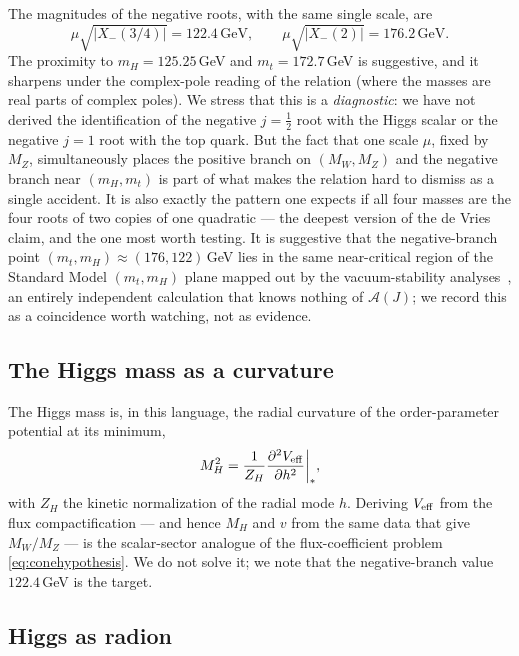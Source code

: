 \documentclass[11pt]{article}
\theoremstyle{plain}
\theoremstyle{definition}
\newcommand{\cA}{\mathcal{A}}
\newcommand{\Xm}{X_{-}}
\newcommand{\half}{\tfrac12}
\begin{document}
The magnitudes of the negative roots, with the same single scale, are
\begin{equation}
\mu\sqrt{|\Xm(3/4)|}=122.4\,\text{GeV},\qquad
\mu\sqrt{|\Xm(2)|}=176.2\,\text{GeV}.
\end{equation}
The proximity to $m_H=125.25\,$GeV and $m_t=172.7\,$GeV is suggestive, and
it sharpens under the complex-pole reading of the relation (where the
masses are real parts of complex poles). We stress that this is a
\emph{diagnostic}: we have not derived the identification of the negative
$j=\half$ root with the Higgs scalar or the negative $j=1$ root with the
top quark. But the fact that one scale $\mu$, fixed by $M_Z$, simultaneously
places the positive branch on $(M_W,M_Z)$ and the negative branch near
$(m_H,m_t)$ is part of what makes the relation hard to dismiss as a single
accident. It is also exactly the pattern one expects if all four masses are
the four roots of two copies of one quadratic --- the deepest version of
the de Vries claim, and the one most worth testing. It is suggestive that the
negative-branch point $(m_t,m_H)\approx(176,122)\,$GeV lies in the same
near-critical region of the Standard Model $(m_t,m_H)$ plane mapped out by the
vacuum-stability analyses~\cite{Buttazzo2013}, an entirely independent
calculation that knows nothing of $\cA(J)$; we record this as a coincidence
worth watching, not as evidence.

\subsection{The Higgs mass as a curvature}

The Higgs mass is, in this language, the radial curvature of the
order-parameter potential at its minimum,
\begin{equation}
M_H^2=\frac1{Z_H}\frac{\partial^2 V_{\rm eff}}{\partial h^2}\bigg|_{*},
\end{equation}
with $Z_H$ the kinetic normalization of the radial mode $h$. Deriving
$V_{\rm eff}$ from the flux compactification --- and hence $M_H$ and $v$
from the same data that give $M_W/M_Z$ --- is the scalar-sector analogue of
the flux-coefficient problem \eqref{eq:conehypothesis}. We do not solve it;
we note that the negative-branch value $122.4\,$GeV is the target.

\subsection{Higgs as radion}
\label{sec:radion}
\end{document}
